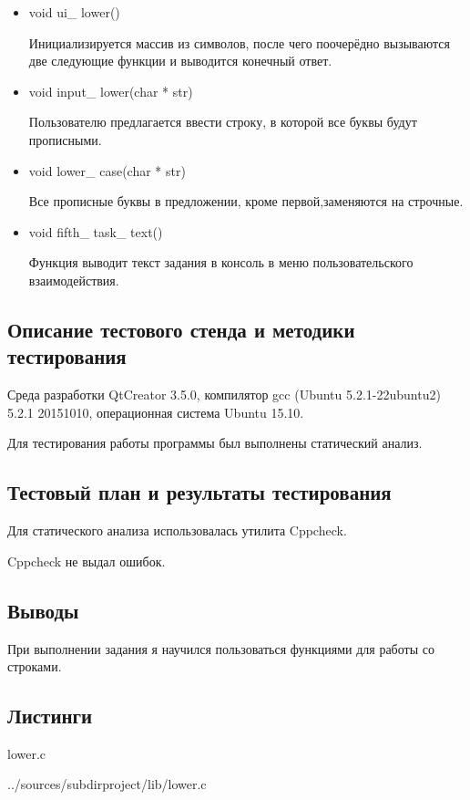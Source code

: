 \documentclass[12pt,a4paper]{report}
\begin{document}
\begin{itemize}
	 \item void ui\_ lower()
	 
 	Инициализируется массив из символов, после чего поочерёдно вызываются две следующие функции и выводится конечный ответ.
 	
 	\item void input\_ lower(char * str)
 	
 	Пользователю предлагается ввести строку, в которой все буквы будут прописными.
 	
 	\item void lower\_ case(char * str)
 	
 	Все прописные буквы в предложении, кроме первой,заменяются на строчные.
 	
 	\item void fifth\_ task\_ text()
	
	Функция выводит текст задания в консоль в меню пользовательского взаимодействия. 
\end{itemize}
	
	
\subsection{Описание тестового стенда и методики тестирования}
Среда разработки QtCreator 3.5.0, компилятор gcc (Ubuntu 5.2.1-22ubuntu2) 5.2.1 20151010, операционная система Ubuntu 15.10.

Для тестирования работы программы был выполнены статический анализ.
\subsection{Тестовый план и результаты тестирования}

Для статического анализа использовалась утилита Cppcheck.

\vspace{\baselineskip}
 Cppcheck не выдал ошибок.

\vspace{\baselineskip}

\subsection{Выводы}

При выполнении задания я научился пользоваться функциями для работы со строками.
\subsection*{Листинги}
lower.c

{../sources/subdirproject/lib/lower.c}
\end{document}
